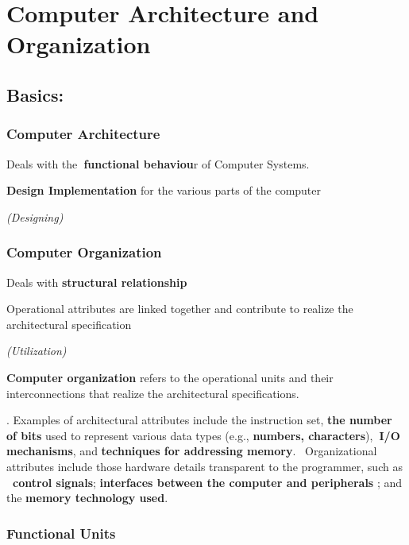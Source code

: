 \documentclass{article}
\begin{document}
\tableofcontents

\section{Computer Architecture and Organization}

\subsection{Basics:}

\subsubsection{Computer Architecture}

Deals with the\textbf{\ functional behaviou}r of Computer Systems.

\textbf{Design Implementation }for the various parts of the computer

\textit{(Designing)}

\subsubsection{Computer Organization}

Deals with \textbf{structural relationship}

Operational attributes are linked together and contribute to realize the
architectural specification

\textit{(Utilization)}

\bigskip

\textbf{Computer organization} refers to the operational units and their
interconnections that realize the architectural specifications.

\bigskip . Examples of architectural attributes include the instruction set, 
\textbf{the number of bits} used to represent various data types (e.g., 
\textbf{numbers, characters}),\textbf{\ I/O mechanisms}, and \textbf{%
techniques for addressing memory}. \bigskip\ Organizational attributes
include those hardware details transparent to the programmer, such as\textbf{%
\ control signals}; \textbf{interfaces between the computer and peripherals}%
; and the \textbf{memory technology used}.

\bigskip

\subsubsection{Functional Units}
\end{document}

